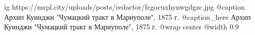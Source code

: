  
 
 
 
 

\ifcmt
  ig https://mrpl.city/uploads/posts/redactor/fcgocuxhynwgdgzc.jpg
	@caption Архип Куинджи "Чумацкий тракт в Мариуполе", 1875 г.
	@caption_here Архип Куинджи "Чумацкий тракт в Мариуполе", 1875 г.
  @wrap center
  @width 0.9
\fi
